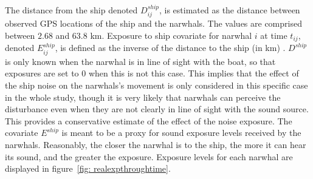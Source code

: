 \documentclass[11pt]{article}
\newcommand {\1}{\mathbb{1}}
\theoremstyle{definition}
\theoremstyle{remark}
\theoremstyle{remark}
\begin{document}

The distance from the ship denoted $D^{ship}_{ij}$, is estimated as the distance between observed GPS locations of the ship and the narwhals. The values are comprised between $2.68$ and $63.8$ km.
Exposure to ship covariate for narwhal $i$ at time $t_{ij}$, denoted $E^{ship}_{ij}$, is defined as the inverse of the distance to the ship (in km) \cite{heide-jorgensen_behavioral_2021}.
$D^{ship}$ is only known when the narwhal is in line of sight with the boat, so that exposures are set to $0$ when this is not this case. This implies that the effect of the ship noise on the narwhals's movement is only considered in this specific case in the whole study, though it is very likely that narwhals can perceive the disturbance even when they are not clearly in line of sight with the sound source. This provides a conservative estimate of the effect of the noise exposure. The covariate $E^{ship}$ is meant to be a proxy for sound exposure levels received by the narwhals. Reasonably, the closer the narwhal is to the ship, the more it can hear its sound, and the greater the exposure. Exposure levels for each narwhal are displayed in figure~\ref{fig: realexpthroughtime}.
\end{document}
